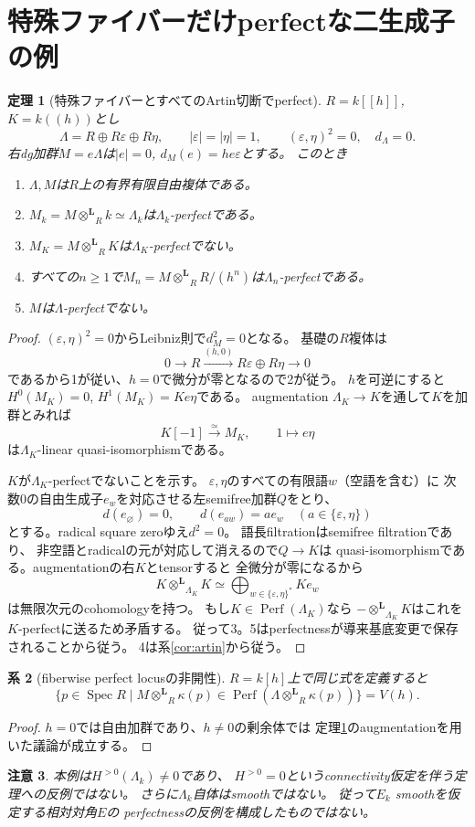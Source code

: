 \documentclass[a4paper,11pt]{ltjsarticle}
\newtheorem{theorem}{定理}[section]
\newtheorem{corollary}[theorem]{系}
\newtheorem{remark}[theorem]{注意}
\newcommand{\Perf}{\operatorname{Perf}}
\newcommand{\otL}{\mathbin{\otimes^{\mathbf L}}}
\newcommand{\Spec}{\operatorname{Spec}}
\begin{document}
\section{特殊ファイバーだけperfectな二生成子の例}
\begin{theorem}[特殊ファイバーとすべてのArtin切断でperfect]\label{thm:two}
$R=k[[h]]$, $K=k((h))$とし
\[
\Lambda=R\oplus R\varepsilon\oplus R\eta,\qquad
|\varepsilon|=|\eta|=1,\qquad
(\varepsilon,\eta)^2=0,\quad d_\Lambda=0.
\]
右dg加群$M=e\Lambda$は$|e|=0$, $d_M(e)=he\varepsilon$とする。
このとき
\begin{enumerate}
\item $\Lambda,M$は$R$上の有界有限自由複体である。
\item $M_k=M\otL_Rk\simeq\Lambda_k$は$\Lambda_k$-perfectである。
\item $M_K=M\otL_RK$は$\Lambda_K$-perfectでない。
\item すべての$n\ge1$で$M_n=M\otL_RR/(h^n)$は$\Lambda_n$-perfectである。
\item $M$は$\Lambda$-perfectでない。
\end{enumerate}
\end{theorem}
\begin{proof}
$(\varepsilon,\eta)^2=0$からLeibniz則で$d_M^2=0$となる。
基礎の$R$複体は
\[
0\longrightarrow R\xrightarrow{(h,0)}
R\varepsilon\oplus R\eta\longrightarrow0
\]
であるから1が従い、$h=0$で微分が零となるので2が従う。
$h$を可逆にすると$H^0(M_K)=0$, $H^1(M_K)=Ke\eta$である。
augmentation $\Lambda_K\to K$を通して$K$を加群とみれば
\[
K[-1]\xrightarrow{\simeq}M_K,\qquad1\longmapsto e\eta
\]
は$\Lambda_K$-linear quasi-isomorphismである。

$K$が$\Lambda_K$-perfectでないことを示す。
$\varepsilon,\eta$のすべての有限語$w$（空語を含む）に
次数0の自由生成子$e_w$を対応させる左semifree加群$Q$をとり、
\[
d(e_\varnothing)=0,\qquad d(e_{aw})=ae_w
\quad (a\in\{\varepsilon,\eta\})
\]
とする。radical square zeroゆえ$d^2=0$。
語長filtrationはsemifree filtrationであり、
非空語とradicalの元が対応して消えるので$Q\to K$は
quasi-isomorphismである。augmentationの右$K$とtensorすると
全微分が零になるから
\[
K\otL_{\Lambda_K}K\simeq
\bigoplus_{w\in\{\varepsilon,\eta\}^{*}}Ke_w
\]
は無限次元のcohomologyを持つ。
もし$K\in\Perf(\Lambda_K)$なら
$-\otL_{\Lambda_K}K$はこれを$K$-perfectに送るため矛盾する。
従って3。5はperfectnessが導来基底変更で保存されることから従う。
4は系\ref{cor:artin}から従う。
\end{proof}

\begin{corollary}[fiberwise perfect locusの非開性]
$R=k[h]$上で同じ式を定義すると
\[
\{p\in\Spec R\mid M\otL_R\kappa(p)\in
\Perf(\Lambda\otL_R\kappa(p))\}=V(h).
\]
\end{corollary}
\begin{proof}
$h=0$では自由加群であり、$h\ne0$の剰余体では
定理\ref{thm:two}のaugmentationを用いた議論が成立する。
\end{proof}
\begin{remark}
本例は$H^{>0}(\Lambda_k)\ne0$であり、
$H^{>0}=0$というconnectivity仮定を伴う定理への反例ではない。
さらに$\Lambda_k$自体はsmoothではない。
従って$E_k$ smoothを仮定する相対対角$E$の
perfectnessの反例を構成したものではない。
\end{remark}
\end{document}
